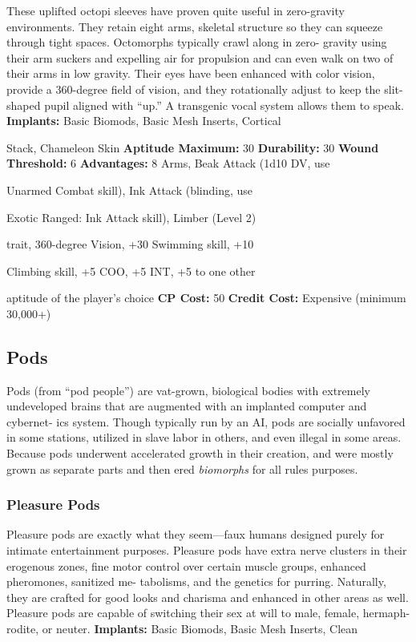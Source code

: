 These uplifted octopi sleeves have proven quite useful 
in zero-gravity environments. They retain eight arms, 
skeletal structure so they can squeeze through tight 
spaces. Octomorphs typically crawl along in zero-
gravity using their arm suckers and expelling air for 
propulsion and can even walk on two of their arms 
in low gravity. Their eyes have been enhanced with 
color vision, provide a 360-degree field of vision, and 
they rotationally adjust to keep the slit-shaped pupil 
aligned with ``up.'' A transgenic vocal system allows 
them to speak.
\textbf{Implants: }Basic Biomods, Basic Mesh Inserts, Cortical 

Stack, Chameleon Skin
\textbf{Aptitude Maximum: }30
\textbf{Durability:} 30
\textbf{Wound Threshold:} 6
\textbf{Advantages:} 8 Arms, Beak Attack (1d10 DV, use 

Unarmed Combat skill), Ink Attack (blinding, use 

Exotic Ranged: Ink Attack skill), Limber (Level 2) 

trait, 360-degree Vision, +30 Swimming skill, +10 

Climbing skill, +5 COO, +5 INT, +5 to one other 

aptitude of the player's choice
\textbf{CP Cost:} 50
\textbf{Credit Cost: }Expensive (minimum 30,000+)

\subsection{Pods}

Pods (from ``pod people'') are vat-grown, biological 
bodies with extremely undeveloped brains that are 
augmented with an implanted computer and cybernet-
ics system. Though typically run by an AI, pods are 
socially unfavored in some stations, utilized in slave 
labor in others, and even illegal in some areas. Because 
pods underwent accelerated growth in their creation, 
and were mostly grown as separate parts and then 
ered \textit{biomorphs} for all rules purposes.

\subsubsection{Pleasure Pods}

Pleasure pods are exactly what they seem—faux 
humans designed purely for intimate entertainment 
purposes. Pleasure pods have extra nerve clusters in 
their erogenous zones, fine motor control over certain 
muscle groups, enhanced pheromones, sanitized me-
tabolisms, and the genetics for purring. Naturally, they 
are crafted for good looks and charisma and enhanced 
in other areas as well. Pleasure pods are capable of 
switching their sex at will to male, female, hermaph-
rodite, or neuter.
\textbf{Implants: }Basic Biomods, Basic Mesh Inserts, Clean 

